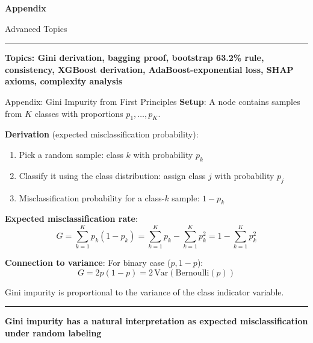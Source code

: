 \documentclass[8pt,aspectratio=169]{beamer}
\newcommand{\bottomnote}[1]{%
\vfill
\vspace{-2mm}
\textcolor{mllavender2}{\rule{\textwidth}{0.4pt}}
\vspace{1mm}
\footnotesize
\textbf{#1}
}
\begin{document}
\begin{frame}{}
\vfill
\begin{center}
{\Huge \textcolor{mlpurple}{\textbf{Appendix}}}

\vspace{1em}
{\Large Advanced Topics}
\end{center}
\vfill
\bottomnote{Topics: Gini derivation, bagging proof, bootstrap 63.2\% rule, consistency, XGBoost derivation, AdaBoost-exponential loss, SHAP axioms, complexity analysis}
\end{frame}

\begin{frame}[t]{Appendix: Gini Impurity from First Principles}
\textbf{Setup}: A node contains samples from $K$ classes with proportions $p_1, \ldots, p_K$.

\vspace{0.3em}
\textbf{Derivation} (expected misclassification probability):
\begin{enumerate}
\item Pick a random sample: class $k$ with probability $p_k$
\item Classify it using the class distribution: assign class $j$ with probability $p_j$
\item Misclassification probability for a class-$k$ sample: $1 - p_k$
\end{enumerate}

\vspace{0.3em}
\textbf{Expected misclassification rate}:
\[
G = \sum_{k=1}^{K} p_k(1 - p_k) = \sum_{k=1}^{K} p_k - \sum_{k=1}^{K} p_k^2 = 1 - \sum_{k=1}^{K} p_k^2
\]

\textbf{Connection to variance}: For binary case ($p, 1-p$):
\[
G = 2p(1-p) = 2\,\text{Var}(\text{Bernoulli}(p))
\]

Gini impurity is proportional to the variance of the class indicator variable.
\bottomnote{Gini impurity has a natural interpretation as expected misclassification under random labeling}
\end{frame}
\end{document}
